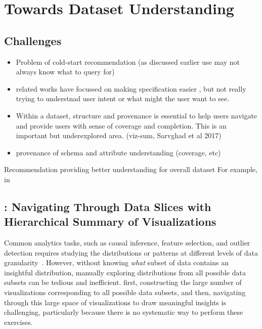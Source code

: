 \section{Towards Dataset Understanding\label{sec:understanding}}
\subsection{Challenges}
\begin{itemize}
\item Problem of cold-start recommendation (as discussed earlier use may not always know what to query for)
\item related works have focussed on making specification easier , but not really trying to understnad user intent or what might the user want to see.
\item Within a dataset, structure and provenance is essential to help users navigate and provide users with sense of coverage and completion. This is an important but underexplored area. (viz-sum, Sarvghad et al 2017)
\item provenance of schema and attribute understanding (coverage, etc) 
\end{itemize}
Recommendation providing better understanding for overall dataset
For example, in \zv 

\subsection{\sbd: Navigating Through Data Slices with Hierarchical Summary of Visualizations}
\par Common analytics tasks, such as causal inference, feature selection, and outlier detection requires studying the distributions or patterns at different levels of data granularity~\cite{Anand2015,Wu2013,Heer2012}. However, without knowing \textit{what} subset of data contains an insightful distribution, manually exploring distributions from all possible data subsets can be tedious and inefficient. first, constructing the large number of visualizations corresponding to all possible data subsets, and then, navigating through this large space of visualizations to draw meaningful insights is challenging, particularly because there is no systematic way to perform these exercises.

